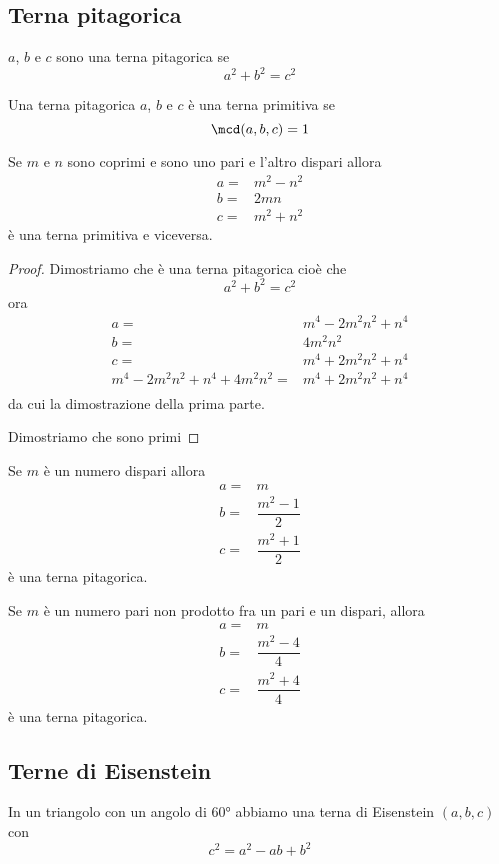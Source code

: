 \subsection{Terna pitagorica}
\begin{defn}
$a$, $b$ e $c$ sono una terna pitagorica se \[a^2+b^2=c^2\]
\end{defn}
\begin{defn}
Una terna pitagorica  $a$, $b$ e $c$ è una terna primitiva se
\[\mcd(a,b,c)=1\]
\end{defn}
\begin{thm}
	Se $m$ e $n$ sono coprimi e sono uno pari e l'altro dispari allora
	\begin{align*}
	a=&m^2-n^2\\
	b=&2mn\\
	c=&m^2+n^2
	\end{align*}
	è una terna primitiva e viceversa. 
\end{thm}
\begin{proof}
	Dimostriamo che è una terna pitagorica cioè che \[a^2+b^2=c^2\]
	ora 
		\begin{align*}
	a=&m^4-2m^2n^2+n^4\\
	b=&4m^2n^2\\
	c=&m^4+2m^2n^2+n^4\\
	m^4-2m^2n^2+n^4+4m^2n^2=&m^4+2m^2n^2+n^4\\
	\end{align*}
	da cui la dimostrazione della prima parte. 
	
	Dimostriamo che sono primi
\end{proof}
\begin{thm}
	Se $m$ è un numero dispari allora
		\begin{align*}
	a=&m\\
	b=&\dfrac{m^2-1}{2} \\
	c=&\dfrac{m^2+1}{2}
	\end{align*}
	è una terna pitagorica.\par
		Se $m$ è un numero pari non prodotto fra un pari e un dispari, allora
	\begin{align*}
	a=&m\\
	b=&\dfrac{m^2-4}{4} \\
	c=&\dfrac{m^2+4}{4}
	\end{align*}
		è una terna pitagorica.
\end{thm}
\subsection{Terne di Eisenstein}
In un triangolo con un angolo  di $\ang{60}$
abbiamo una terna di Eisenstein $(a,b,c)$ con
\begin{equation*}
	c^2=a^2-ab+b^2
\end{equation*}

